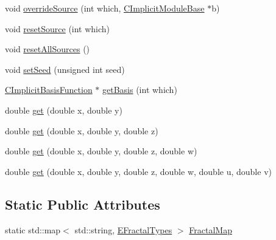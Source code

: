 \begin{DoxyCompactItemize}
\item 
void \hyperlink{classanl_1_1CImplicitFractal_a2363ebe6c57e93c457280bcad216c25a}{overrideSource} (int which, \hyperlink{classanl_1_1CImplicitModuleBase}{CImplicitModuleBase} $\ast$b)
\item 
void \hyperlink{classanl_1_1CImplicitFractal_a2c2ac339140c8a7324f67066e7cfc2ca}{resetSource} (int which)
\item 
void \hyperlink{classanl_1_1CImplicitFractal_a01d51d0f916a74dd56a45abd822ed533}{resetAllSources} ()
\item 
void \hyperlink{classanl_1_1CImplicitFractal_ad50523033bd36b13bbc21aaa3def0499}{setSeed} (unsigned int seed)
\item 
\hyperlink{classanl_1_1CImplicitBasisFunction}{CImplicitBasisFunction} $\ast$ \hyperlink{classanl_1_1CImplicitFractal_afccdd6ecd1e395b2fae93072398d8be5}{getBasis} (int which)
\item 
double \hyperlink{classanl_1_1CImplicitFractal_a9ce533cdedbee58d917e8db1ab632d2f}{get} (double x, double y)
\item 
double \hyperlink{classanl_1_1CImplicitFractal_a25ac928857e827545123d8f5098e5131}{get} (double x, double y, double z)
\item 
double \hyperlink{classanl_1_1CImplicitFractal_a39627567ff6ca149513d0870592f1f8e}{get} (double x, double y, double z, double w)
\item 
double \hyperlink{classanl_1_1CImplicitFractal_ad70eef24b8616b72b7319f10cc1be82d}{get} (double x, double y, double z, double w, double u, double v)
\end{DoxyCompactItemize}
\subsection*{Static Public Attributes}
\begin{DoxyCompactItemize}
\item 
static std::map$<$ std::string, \hyperlink{namespaceanl_a1fded64e4dcb34f185ebd466d3b9da30}{EFractalTypes} $>$ \hyperlink{classanl_1_1CImplicitFractal_ac95addb557671d188f3902351d123493}{FractalMap}
\end{DoxyCompactItemize}
